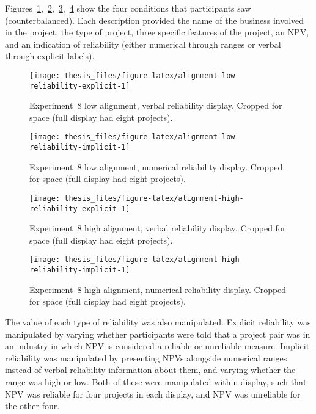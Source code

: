 \documentclass[a4paper, nobind]{templates/ociamthesis}
\theoremstyle{definition}
\theoremstyle{definition}
\theoremstyle{definition}
\theoremstyle{definition}
\theoremstyle{remark}
\begin{document}
Figures~\ref{fig:alignment-low-reliability-explicit},~\ref{fig:alignment-low-reliability-implicit},~\ref{fig:alignment-high-reliability-explicit},~\ref{fig:alignment-high-reliability-implicit}
show the four conditions that participants saw (counterbalanced). Each
description provided the name of the business involved in the project, the type
of project, three specific features of the project, an NPV, and an indication of
reliability (either numerical through ranges or verbal through explicit labels).

\begin{figure}
\texttt{[image: thesis\_files/figure-latex/alignment-low-reliability-explicit-1]} \caption{Experiment 8 low alignment, verbal reliability display. Cropped for space (full display had eight projects).}\label{fig:alignment-low-reliability-explicit}
\end{figure}

\begin{figure}
\texttt{[image: thesis\_files/figure-latex/alignment-low-reliability-implicit-1]} \caption{Experiment 8 low alignment, numerical reliability display. Cropped for space (full display had eight projects).}\label{fig:alignment-low-reliability-implicit}
\end{figure}

\begin{figure}
\texttt{[image: thesis\_files/figure-latex/alignment-high-reliability-explicit-1]} \caption{Experiment 8 high alignment, verbal reliability display. Cropped for space (full display had eight projects).}\label{fig:alignment-high-reliability-explicit}
\end{figure}

\begin{figure}
\texttt{[image: thesis\_files/figure-latex/alignment-high-reliability-implicit-1]} \caption{Experiment 8 high alignment, numerical reliability display. Cropped for space (full display had eight projects).}\label{fig:alignment-high-reliability-implicit}
\end{figure}

The value of each type of reliability was also manipulated. Explicit reliability
was manipulated by varying whether participants were told that a project pair
was in an industry in which NPV is considered a reliable or unreliable measure.
Implicit reliability was manipulated by presenting NPVs alongside numerical
ranges instead of verbal reliability information about them, and varying whether
the range was high or low. Both of these were manipulated within-display, such
that NPV was reliable for four projects in each display, and NPV was unreliable
for the other four.
\end{document}
